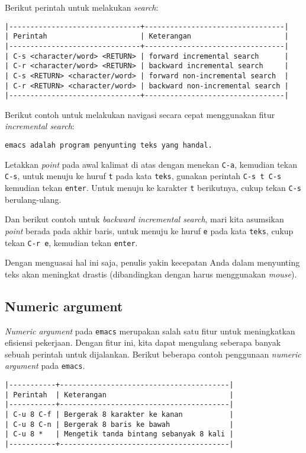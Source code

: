 \documentclass{article}
\begin{document}
Berikut perintah untuk melakukan \emph{search}:

\begin{verbatim}
|-------------------------------+---------------------------------|
| Perintah                      | Keterangan                      |
|-------------------------------+---------------------------------|
| C-s <character/word> <RETURN> | forward incremental search      |
| C-r <character/word> <RETURN> | backward incremental search     |
| C-s <RETURN> <character/word> | forward non-incremental search  |
| C-r <RETURN> <character/word> | backward non-incremental search |
|-------------------------------+---------------------------------|
\end{verbatim}

Berikut contoh untuk melakukan navigasi secara cepat menggunakan fitur
\emph{incremental search}:

\begin{verbatim}
emacs adalah program penyunting teks yang handal.
\end{verbatim}

Letakkan \emph{point} pada awal kalimat di atas dengan menekan \verb=C-a=, 
kemudian tekan \verb=C-s=, untuk menuju ke huruf \verb=t= pada kata 
\verb=teks=, gunakan perintah \verb=C-s t C-s= kemudian tekan \verb=enter=. 
Untuk menuju ke karakter \verb=t= berikutnya, cukup tekan \verb=C-s=
berulang-ulang.

Dan berikut contoh untuk \emph{backward incremental search}, mari kita
asumsikan \emph{point} berada pada akhir baris, untuk menuju ke huruf 
\verb=e= pada kata \verb=teks=, cukup tekan \verb=C-r e=, kemudian tekan 
\verb=enter=.

Dengan menguasai hal ini saja, penulis yakin kecepatan Anda dalam menyunting 
teks akan meningkat drastis (dibandingkan dengan harus menggunakan 
\emph{mouse}).

\subsection{Numeric argument}
\emph{Numeric argument} pada \verb=emacs= merupakan salah satu fitur
untuk meningkatkan efisiensi pekerjaan. Dengan fitur ini, kita dapat 
mengulang seberapa banyak sebuah perintah untuk dijalankan. Berikut 
beberapa contoh penggunaan \emph{numeric argument} pada \verb=emacs=.

\begin{verbatim}
|-----------+----------------------------------------|
| Perintah  | Keterangan                             |
|-----------+----------------------------------------|
| C-u 8 C-f | Bergerak 8 karakter ke kanan           |
| C-u 8 C-n | Bergerak 8 baris ke bawah              |
| C-u 8 *   | Mengetik tanda bintang sebanyak 8 kali |
|-----------+----------------------------------------|
\end{verbatim}
\end{document}
